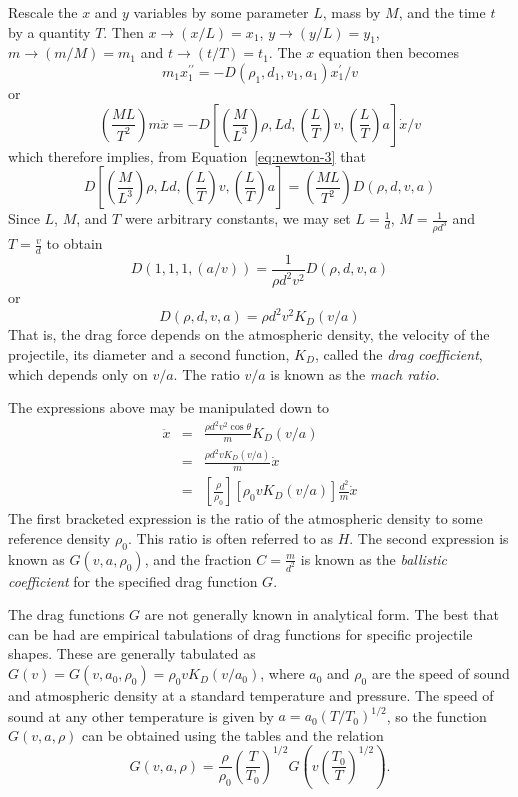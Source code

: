 Rescale the $x$ and $y$ variables by some parameter $L$, mass by $M$,
and the time $t$ by a quantity $T$.  Then $x\rightarrow(x/L)=x_1$,
$y\rightarrow(y/L)=y_1$, $m\rightarrow(m/M)=m_1$ and
$t\rightarrow(t/T)=t_1$.  The $x$ equation then becomes
\begin{equation}
m_1x_1^{\prime\prime}=-D(\rho_1,d_1,v_1,a_1)x_1^{\prime}/v
\end{equation}
or
\begin{equation}
\left(\frac{ML}{T^2}\right)m\ddot{x}=-D\left[ \left(\frac {M}{L^3}\right)\rho,Ld,\left(\frac
LT\right)v,\left(\frac LT\right)a\right] \dot{x}/v
\end{equation}
which therefore implies, from Equation~\ref{eq:newton-3} that
\begin{equation}
D\left[\left(\frac {M}{L^3}\right)\rho,Ld,\left(\frac LT\right)v,\left(\frac LT\right)a\right]=\left(\frac
{ML}{T^2}\right) D(\rho,d,v,a)
\end{equation}
Since $L$, $M$, and $T$ were arbitrary constants, we may set $L=\frac
1d$, $M=\frac{1}{\rho d^3}$ and $T=\frac vd$ to obtain
\begin{equation}
D(1,1,1,(a/v))=\frac{1}{\rho d^2v^2}D(\rho,d,v,a)
\end{equation}
or
\begin{equation}
D(\rho,d,v,a)=\rho d^2v^2K_D(v/a)
\end{equation}
That is, the drag force depends on the atmospheric density, the
velocity of the projectile, its diameter and a second function, $K_D$,
called the {\em drag coefficient}, which depends only on $v/a$.  The
ratio $v/a$ is known as the {\em mach ratio}.

The expressions above may be manipulated down to  
\begin{eqnarray}
\ddot{x}&=&\frac{\rho d^2 v^2 \cos \theta}{m} K_D(v/a)\\
        &=& \frac{\rho d^2 v K_D(v/a)}{m} \dot{x} \\
        &=& \left[\frac {\rho}{\rho_0}\right] \left[ \rho_0 v K_D(v/a)
\right] \frac{d^2}{m} \dot{x}
\end{eqnarray}
The first bracketed expression is the ratio of the atmospheric density
to some reference density $\rho_0$. This ratio is often referred to as
$H$.  The second expression is known as $G(v,a,\rho_0)$, and the
fraction $C=\frac{m}{d^2}$ is known as the {\em ballistic coefficient}
for the specified drag function $G$.

The drag functions $G$ are not generally known in analytical form.
The best that can be had are empirical tabulations of drag functions
for specific projectile shapes.  These are generally tabulated as
$G(v)=G(v,a_0,\rho_0)=\rho_0 v K_D(v/a_0)$, where $a_0$ and $\rho_0$
are the speed of sound and atmospheric density at a standard
temperature and pressure.  The speed of sound at any other temperature
is given by $a=a_0 (T/T_0)^{1/2}$, so the function $G(v,a,\rho)$ can
be obtained using the tables and the relation
$$G(v,a,\rho)=\frac{\rho}{\rho_0}\left(\frac{T}{T_0}\right)^{1/2}
G(v\left(\frac{T_0}{T}\right)^{1/2}).$$

